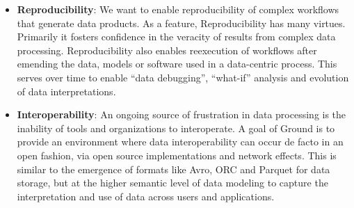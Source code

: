 \documentclass[10pt,letterpaper]{article}
\begin{document}
\begin{itemize}
\item {\bf Reproducibility}:
We want to enable reproducibility of complex workflows that generate data products. As a feature, Reproducibility has many virtues.  Primarily it fosters confidence in the veracity of results from complex data processing.  Reproducibility also enables reexecution of workflows after emending the data, models or software used in a data-centric process.  This serves over time to enable ``data debugging'', ``what-if'' analysis and evolution of data interpretations.

\item {\bf Interoperability}: An ongoing source of frustration in data processing is the inability of tools and organizations to interoperate.
A goal of Ground is to provide an environment where data interoperability can occur de facto in an open  fashion, via open source implementations and network effects.  This is similar to the emergence of formats like Avro, ORC and Parquet for data storage, but at the higher semantic level of data modeling to capture the interpretation and use of data across users and applications.


\end{itemize}
\end{document}
